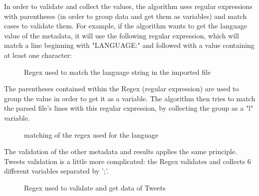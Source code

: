 \documentclass[a4paper,11pt]{report}
\begin{document}
In order to validate and collect the values, the algorithm uses regular expressions with parentheses (in order to group data and get them as variables) and match cases to validate them. For example, if the algorithm wants to get the language value of the metadata, it will use the following regular expression, which will match a line beginning with "LANGUAGE:" and followed with a value containing at least one character:
\begin{figure}[H]
\vspace{-5pt}
\begin{center}
\vspace{-5pt}
\caption{Regex used to match the language string in the imported file}
\end{center}
\end{figure}

The parentheses contained within the Regex (regular expression) are used to group the value in order to get it as a variable. The algorithm then tries to match the parsed file's lines with this regular expression, by collecting the group as a "l" variable.
\begin{figure}[H]
\vspace{-5pt}
\begin{center}
\vspace{-5pt}
\caption{matching of the regex used for the language}
\end{center}
\end{figure}

The validation of the other metadata and results applies the same principle. Tweets validation is a little more complicated: the Regex validates and collects 6 different variables separated by ';'.
\begin{figure}[H]
\vspace{-5pt}
\begin{center}
\vspace{-20pt}
\caption{Regex used to validate and get data of Tweets}
\end{center}
\end{figure}
\newpage
\end{document}
